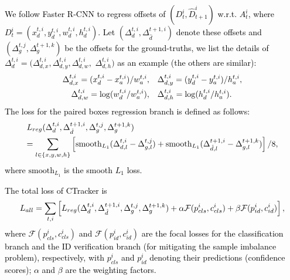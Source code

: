\documentclass[../arXiv_main.tex]{subfiles}
\newcommand{\CRyang}[1]{\textcolor{black}{#1}}
\begin{document}
\CRyang{We follow Faster R-CNN \cite{faster} to regress offsets of $(D_t^i, \hat{D}_{t+1}^i)$ w.r.t. $A_t^i$, where $D_t^i= (x^{t,i}_d, y^{t,i}_d, w^{t,i}_d, h^{t,i}_d)$. Let $(\Delta^{t,i}_d, \Delta^{t+1,i}_{\hat{d}})$ denote these offsets and $(\Delta^{t,j}_g, \Delta^{t+1,k}_g)$ be the offsets for the ground-truths, we list the details of $\Delta^{t,i}_d = (\Delta^{t,i}_{d,x}, \Delta^{t,i}_{d,y}, \Delta^{t,i}_{d,w},$ $\Delta^{t,i}_{d,h})$ as an example (the others are similar):}
\begin{equation}
\begin{aligned}
    \CRyang{\Delta^{t,i}_{d,x} = (x^{t,i}_d - x^{t,i}_a)/w^{t,i}_a,} & \quad \CRyang{\Delta^{t,i}_{d,y} = (y^{t,i}_d - y^{t,i}_a)/h^{t,i}_a, } \\ \CRyang{\Delta^{t,i}_{d,w} = \mathrm{log}(w^{t,i}_d/w^{t,i}_a),} & \quad \CRyang{\Delta^{t,i}_{d,h} = \mathrm{log}(h^{t,i}_d/h^{t,i}_a).}
\end{aligned}
\end{equation}
\CRyang{The loss for the paired boxes regression branch is defined as follows:}
\begin{equation}
\begin{split}
\label{eq:l1}
&\CRyang{L_{reg}(\Delta^{t,i}_d, \Delta^{t+1,i}_{\hat{d}}, \Delta^{t,j}_g, \Delta^{t+1,k}_g)} \\
& \CRyang{=  \sum_{\CRyang{l}\in\{x,y,w,h\}}\left[{\mathrm{smooth}_{L_1}}(\Delta^{t,i}_{d,l} - \Delta^{t,j}_{g,l}) + {\mathrm{smooth}_{L_1}}(\Delta^{t+1,i}_{\hat{d},l} - \Delta^{t+1,k}_{g,l})\right]/8,}
\end{split}
\end{equation}
\CRyang{where ${\mathrm{smooth}_{L_1}}$ is the smooth $L_{1}$ loss. }



\CRyang{The total loss of CTracker is}
\begin{equation}
\CRyang{L_{all} = \sum_{t,i} \left[ L_{reg}(\Delta^{t,i}_d, \Delta^{t+1,i}_{\hat{d}}, \Delta^{t,j}_g, \Delta^{t+1,k}_g) + \alpha \mathcal{F}(p^i_{cls}, c^i_{cls}) +\beta \mathcal{F}(p^i_{id}, c^i_{id})\right],}
\label{eq:totalloss}
\end{equation}
\CRyang{where $\mathcal{F}(p^i_{cls}, c^i_{cls})$ and $\mathcal{F}(p^i_{id}, c^i_{id})$ are the focal losses \cite{lin2017focal} for the classification branch and the ID verification branch (for mitigating the sample imbalance problem), respectively, with $p^i_{cls}$ and $p^i_{id}$ denoting their predictions (confidence scores); $\alpha$ and $\beta$ are the weighting factors.}
\end{document}
